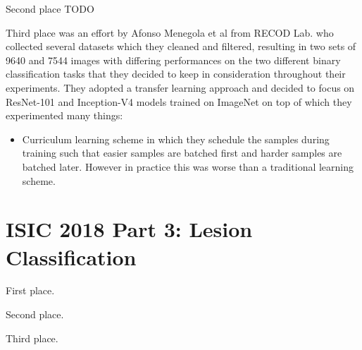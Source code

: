 Second place TODO

Third place was an effort by Afonso Menegola et al\cite{isic2017second} from RECOD Lab. who collected several datasets which they cleaned and filtered, resulting in two sets of 9640 and 7544 images with differing performances on the two different binary classification tasks that they decided to keep in consideration throughout their experiments. They adopted a transfer learning approach and decided to focus on ResNet-101 and Inception-V4 models trained on ImageNet on top of which they experimented many things:

\begin{itemize}
    \item Curriculum learning scheme in which they schedule the samples during training such that easier samples are batched first and harder samples are batched later. However in practice this was worse than a traditional learning scheme.
\end{itemize}

\section{ISIC 2018 Part 3: Lesion Classification}

First place.

Second place.

Third place.
